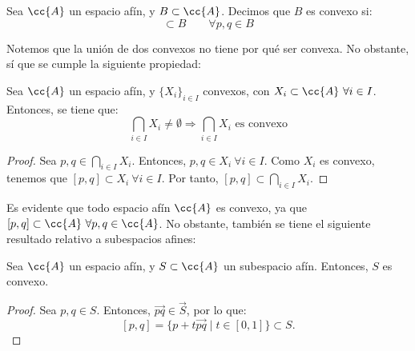 \begin{definicion}
    Sea $\cc{A}$ un espacio afín, y $B\subset \cc{A}$. Decimos que $B$ es convexo si:
    \begin{equation*}
        [p,q]\subset B \qquad \forall p,q\in B
    \end{equation*}
\end{definicion}

Notemos que la unión de dos convexos no tiene por qué ser convexa. No obstante, sí que se cumple la siguiente propiedad:
\begin{prop}
    Sea $\cc{A}$ un espacio afín, y $\{X_i\}_{i\in I}$ convexos, con $X_i\subset \cc{A}~\forall i\in I$. Entonces, se tiene que:
    \begin{equation*}
        \bigcap_{i\in I}X_i \neq \emptyset \Longrightarrow \bigcap_{i\in I}X_i \text{ es convexo}
    \end{equation*}
\end{prop}
\begin{proof}
    Sea $p,q\in \bigcap_{i\in I}X_i$. Entonces, $p,q\in X_i~\forall i\in I$. Como $X_i$ es convexo, tenemos que $[p,q]\subset X_i~\forall i\in I$.
    Por tanto, $[p,q]\subset \bigcap_{i\in I}X_i$.
\end{proof}

Es evidente que todo espacio afín $\cc{A}$ es convexo, ya que $[p,q]\subset \cc{A}~\forall p,q\in \cc{A}$. No obstante, también se tiene el siguiente resultado relativo a subespacios afines:
\begin{prop}
    Sea $\cc{A}$ un espacio afín, y $S\subset \cc{A}$ un subespacio afín. Entonces, $S$ es convexo.
\end{prop}
\begin{proof}
    Sea $p,q\in S$. Entonces, $\vec{pq}\in \vec{S}$, por lo que:$$[p,q]=\{p+t\vec{pq}\mid t\in [0,1]\} \subset S.$$
\end{proof}

